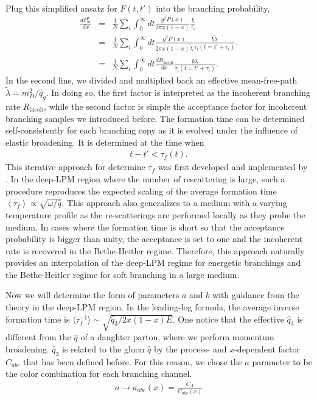 Plug this simplified ansatz for $F(t, t')$ into the branching probability,
\begin{eqnarray}
\frac{dP^{a}_{bc}}{dx} &=& \frac{1}{N}\sum_i \int_0^\infty dt \frac{g^2 P(x)}{2\pi x (1-x)} \frac{b}{\tau_i} \\  
 &=& \frac{1}{N}\sum_i \int_0^\infty dt \frac{g^2 P(x)}{2\pi x (1-x) \tilde{\lambda}} \frac{b \tilde{\lambda}}{\tau_i(t=t'+\tau_i)}.\\
  &=& \frac{1}{N}\sum_i \int_0^\infty dt \frac{dR_{\textrm{incoh}}}{dx} \frac{b \tilde{\lambda}}{\tau_i(t=t'+\tau_i)}.
\end{eqnarray}
In the second line, we divided and multiplied back an effective mean-free-path $\tilde{\lambda} = m_D^2/\hat{q}_g$.
In doing so, the first factor is interpreted as the incoherent branching rate $R_{\textrm{incoh}}$, while the second factor is simple the acceptance factor for incoherent branching samples we introduced before.
The formation time can be determined self-consistently for each branching copy as it is evolved under the influence of elastic broadening.
It is determined at the time when
\begin{eqnarray}
t - t' < \tau_f(t). 
\end{eqnarray}
This iterative approach for determine $\tau_f$ was first developed and implemented by \cite{Zapp:2011ya}.
In the deep-LPM region where the number of rescattering is large, such a procedure reproduces the expected scaling of the average formation time $\left\langle\tau_f\right\rangle \propto \sqrt{\omega/\hat{q}}$.
This approach also generalizes to a medium with a varying temperature profile as the re-scatterings are performed locally as they probe the medium.
In cases where the formation time is short so that the acceptance probability is bigger than unity, the acceptance is set to one and the incoherent rate is recovered in the Bethe-Heitler regime.
Therefore, this approach naturally provides an interpolation of the deep-LPM regime for energetic branchings and the Bethe-Heitler regime for soft branching in a large medium.

Now we will determine the form of parameters $a$ and $b$ with guidance from the theory in the deep-LPM region.
In the leading-log formula, the average inverse formation time is $\langle\tau_f^{-1}\rangle \sim \sqrt{\hat{q}_3 / 2x(1-x)E}$. 
One notice that the effective $\hat{q}_3$ is different from the $\hat{q}$ of a daughter parton, where we perform momentum broadening.
$\hat{q}_3$ is related to the gluon $\hat{q}$ by the process- and $x$-dependent factor $C_{abc}$ that has been defined before.
For this reason, we chose the $a$ parameter to be the color combination for each branching channel.
\begin{eqnarray}
a \rightarrow a_{abc}(x) = \frac{C_A}{C_{abc}(x)}
\end{eqnarray}

